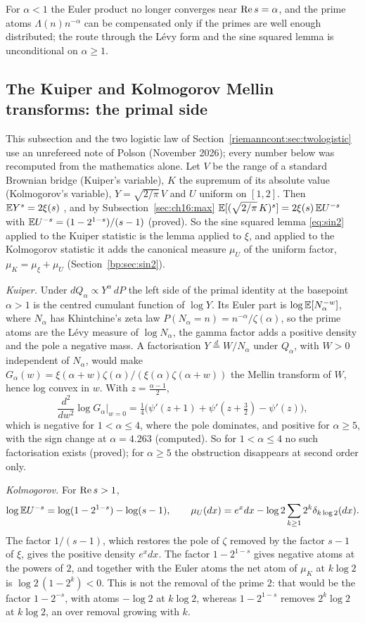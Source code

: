 For $\alpha<1$ the Euler product no longer converges near $\operatorname{Re} s=\alpha$, and the prime atoms $\Lambda(n)n^{-\alpha}$ can be compensated only if the primes are well enough distributed; the route through the L\'evy form and the sine squared lemma is unconditional on $\alpha\ge1$.

\subsection{The Kuiper and Kolmogorov Mellin transforms: the primal side}\label{bp:sec:kk}

This subsection and the two logistic law of Section~\ref{riemanncont:sec:twologistic} use an unrefereed note of Polson (November 2026); every number below was recomputed from the mathematics alone. Let $V$ be the range of a standard Brownian bridge (Kuiper's variable), $K$ the supremum of its absolute value (Kolmogorov's variable), $Y=\sqrt{2/\pi}\,V$ and $U$ uniform on $[1,2]$. Then $\mathbb{E} Y^s=2\xi(s)$ \cite{BPY01}, and by Subsection~\ref{sec:ch16:max} $\mathbb{E}[(\sqrt{2/\pi}\,K)^s]=2\xi(s)\,\mathbb{E} U^{-s}$ with $\mathbb{E} U^{-s}=(1-2^{1-s})/(s-1)$ (proved). So the sine squared lemma \eqref{eq:sin2} applied to the Kuiper statistic is the lemma applied to $\xi$, and applied to the Kolmogorov statistic it adds the canonical measure $\mu_U$ of the uniform factor, $\mu_K=\mu_\xi+\mu_U$ (Section~\ref{bp:sec:sin2}).

\emph{Kuiper.} Under $dQ_\alpha\propto Y^\alpha\,dP$ the left side of the primal identity at the basepoint $\alpha>1$ is the centred cumulant function of $\log Y$. Its Euler part is $\log\mathbb{E}[N_\alpha^{-w}]$, where $N_\alpha$ has Khintchine's zeta law $P(N_\alpha=n)=n^{-\alpha}/\zeta(\alpha)$, so the prime atoms are the L\'evy measure of $\log N_\alpha$, the gamma factor adds a positive density and the pole a negative mass. A factorisation $Y\overset d=W/N_\alpha$ under $Q_\alpha$, with $W>0$ independent of $N_\alpha$, would make $G_\alpha(w)=\xi(\alpha+w)\zeta(\alpha)/(\xi(\alpha)\zeta(\alpha+w))$ the Mellin transform of $W$, hence log convex in $w$. With $z=\frac{\alpha-1}2$,
\[
\frac{d^2}{dw^2}\log G_\alpha\Big|_{w=0}=\tfrac14\big(\psi'(z+1)+\psi'(z+\tfrac32)-\psi'(z)\big),
\]
which is negative for $1<\alpha\le4$, where the pole dominates, and positive for $\alpha\ge5$, with the sign change at $\alpha=4.263$ (computed). So for $1<\alpha\le4$ no such factorisation exists (proved); for $\alpha\ge5$ the obstruction disappears at second order only.

\emph{Kolmogorov.} For $\operatorname{Re} s>1$,
\[
\log\mathbb{E} U^{-s}=\log(1-2^{1-s})-\log(s-1),\qquad \mu_U(dx)=e^{x}dx-\log2\sum_{k\ge1}2^k\delta_{k\log2}(dx).
\]
The factor $1/(s-1)$, which restores the pole of $\zeta$ removed by the factor $s-1$ of $\xi$, gives the positive density $e^xdx$. The factor $1-2^{1-s}$ gives negative atoms at the powers of $2$, and together with the Euler atoms the net atom of $\mu_K$ at $k\log2$ is $\log2\,(1-2^k)<0$. This is not the removal of the prime $2$: that would be the factor $1-2^{-s}$, with atoms $-\log2$ at $k\log2$, whereas $1-2^{1-s}$ removes $2^k\log2$ at $k\log2$, an over removal growing with $k$.

